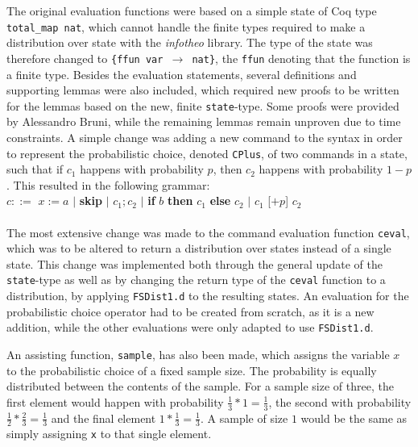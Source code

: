 The original evaluation functions were based on a simple state of Coq type \texttt{total\_map nat}, which cannot handle the finite types required to make a distribution over state with the \textit{infotheo} library. The type of the state was therefore changed to \texttt{\{ffun var $\rightarrow$ nat\}}, the \texttt{ffun} denoting that the function is a finite type.
Besides the evaluation statements, several definitions and supporting lemmas were also included, which required new proofs to be written for the lemmas based on the new, finite \texttt{state}-type. Some proofs were provided by Alessandro Bruni, while the remaining lemmas remain unproven due to time constraints. 
A simple change was adding a new command to the syntax in order to represent the probabilistic choice, denoted \texttt{CPlus}, of two commands in a state, such that if $c_{1}$ happens with probability $p$, then $c_{2}$ happens with probability $1-p$. This resulted in the following grammar: 
\\
$c ::=$ $x := a$ $|$ \textbf{skip} $|$ $c_{1};c_{2}$ $|$ \textbf{if} $b$ \textbf{then} $c_{1}$ \textbf{else} $c_{2}$ $|$ $c_{1}$ [$+p$] $c_{2}$
\\
\\
The most extensive change was made to the command evaluation function \texttt{ceval}, which was to be altered to return a distribution over states instead of a single state. This change was implemented both through the general update of the \texttt{state}-type as well as by changing the return type of the \texttt{ceval} function to a distribution, by applying \texttt{FSDist1.d} to the resulting states. 
An evaluation for the probabilistic choice operator had to be created from scratch, as it is a new addition, while the other evaluations were only adapted to use \texttt{FSDist1.d}.

An assisting function, \texttt{sample}, has also been made, which assigns the variable $x$ to the probabilistic choice of a fixed sample size. The probability is equally distributed between the contents of the sample. For a sample size of three, the first element would happen with probability $\frac{1}{3} * 1 = \frac{1}{3}$, the second with probability $\frac{1}{2} * \frac{2}{3} = \frac{1}{3}$ and the final element $1 * \frac{1}{3}= \frac{1}{3}$.
A sample of size $1$ would be the same as simply assigning \texttt{x} to that single element. 


